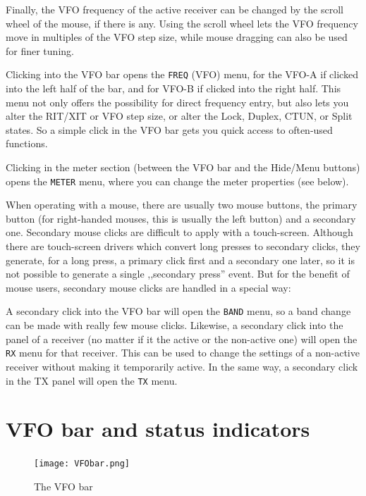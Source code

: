 \documentclass[12pt]{book}
\def\bltt#1{\texttt{\color{blue}#1}}
\begin{document}
 Finally, the VFO frequency of the active
receiver can be changed by the scroll wheel of the mouse, if there
is any. Using the scroll wheel lets the VFO frequency move in multiples
of the VFO step size, while mouse dragging can also be used for
finer tuning.

Clicking into the VFO bar opens the \bltt{FREQ} (VFO) menu,
for the VFO-A if clicked into the left half of the bar, and for
VFO-B if clicked into the right half. This menu not only offers
the possibility for direct frequency entry, but also lets you
alter the RIT/XIT or VFO step size, or alter the Lock, Duplex,
CTUN, or Split states. So a simple click in the VFO bar
gets you quick access to often-used functions.

Clicking in the meter section (between the VFO bar and the
Hide/Menu buttons) opens the \bltt{METER} menu, where
you can change the meter properties (see below).

When operating with a mouse, there are usually two mouse buttons,
the primary button (for right-handed mouses, this is usually
the left button) and a secondary one. Secondary mouse clicks
are difficult to apply with a touch-screen. Although there are
touch-screen drivers which convert long presses to secondary clicks,
they generate, for a long press, a primary click first and a
secondary one later, so it is not possible to generate a
single ,,secondary press'' event. But for the benefit of
mouse users, secondary mouse clicks are handled in a special way:

A secondary click into the VFO bar will open the \bltt{BAND} menu,
so a band change can be made with really few mouse clicks. Likewise,
a secondary click into the panel of a receiver (no matter if it
the active or the non-active one) will open the \bltt{RX} menu
for that receiver. This can be used to change the settings of a
non-active receiver without making it temporarily active. In the
same way, a secondary click in the TX panel will open the
\bltt{TX} menu.

\section{VFO bar and status  indicators}
\label{sec:VFObar}
\begin{figure}[ht]
\center
\texttt{[image: VFObar.png]}
\caption{The VFO bar}
\label{fig:VFObar}
\end{figure}
\end{document}
